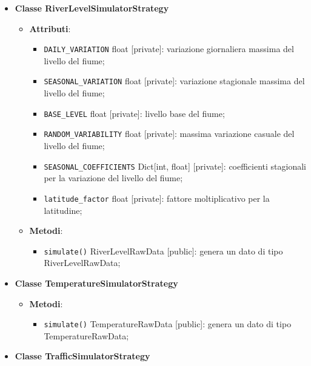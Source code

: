 \begin{itemize}
\begin{itemize}
\begin{itemize}
		            \end{itemize}
	      \end{itemize}
	\item \textbf{Classe RiverLevelSimulatorStrategy}
	      \begin{itemize}
		      \item \textbf{Attributi}:
		            \begin{itemize}
			            \item \texttt{DAILY\_VARIATION} float [private]: variazione giornaliera massima del livello del fiume;
			            \item \texttt{SEASONAL\_VARIATION} float [private]: variazione stagionale massima del livello del fiume;
			            \item \texttt{BASE\_LEVEL} float [private]: livello base del fiume;
			            \item \texttt{RANDOM\_VARIABILITY} float [private]: massima variazione casuale del livello del fiume;
			            \item \texttt{SEASONAL\_COEFFICIENTS} Dict[int, float] [private]: coefficienti stagionali per la variazione del livello del fiume;
			            \item \texttt{latitude\_factor} float [private]: fattore moltiplicativo per la latitudine;
		            \end{itemize}
		      \item \textbf{Metodi}:
		            \begin{itemize}
			            \item \texttt{simulate()} RiverLevelRawData [public]: genera un dato di tipo RiverLevelRawData;
		            \end{itemize}
	      \end{itemize}
	\item \textbf{Classe TemperatureSimulatorStrategy}
	      \begin{itemize}
		      \item \textbf{Metodi}:
		            \begin{itemize}
			            \item \texttt{simulate()} TemperatureRawData [public]: genera un dato di tipo\\ TemperatureRawData;
		            \end{itemize}
	      \end{itemize}
	\item \textbf{Classe TrafficSimulatorStrategy}
	      \begin{itemize}

\end{itemize}
\end{itemize}
